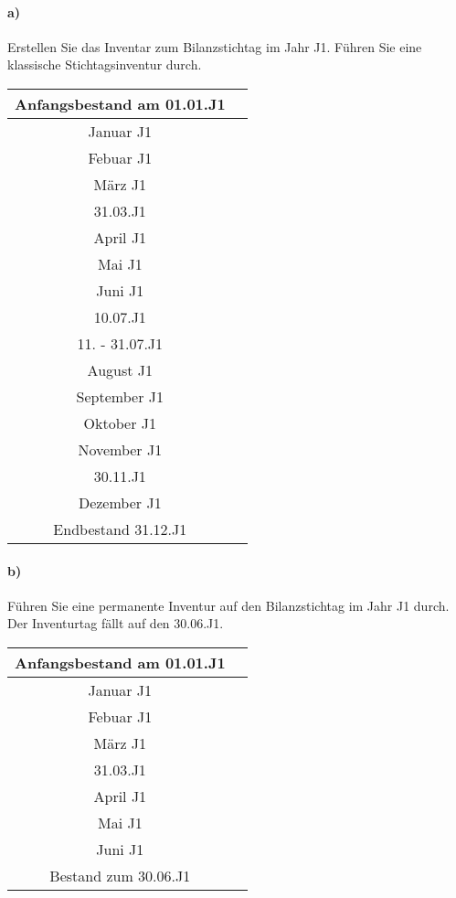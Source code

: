 \documentclass[paper=a4, fontsize=11pt]{scrartcl}
\numberwithin{equation}{section}
\numberwithin{figure}{section}
\numberwithin{table}{section}
\begin{document}
\paragraph{a)}

Erstellen Sie das Inventar zum Bilanzstichtag im Jahr J1. Führen Sie eine klassische Stichtagsinventur durch. \\

\begin{tabular}{c|c}
\hline
Anfangsbestand am 01.01.J1 & \\
\hline
Januar J1 & \\
\hline
Febuar J1 & \\
\hline 
März J1 & \\
\hline
31.03.J1 & \\
\hline
April J1 & \\
\hline
Mai J1 & \\
\hline
Juni J1 & \\
\hline
10.07.J1 & \\
\hline
11. - 31.07.J1 & \\
\hline
August J1 & \\
\hline
September J1 & \\
\hline
Oktober J1 & \\
\hline
November J1 & \\
\hline
30.11.J1 & \\
\hline
Dezember J1 & \\
\hline
Endbestand 31.12.J1 & \\
\hline
\end{tabular}

\paragraph{b)}

Führen Sie eine permanente Inventur auf den Bilanzstichtag im Jahr J1 durch. Der Inventurtag fällt auf den 30.06.J1. \\

\begin{tabular}{c|c}
\hline
Anfangsbestand am 01.01.J1 & \\
\hline
Januar J1 & \\
\hline
Febuar J1 & \\
\hline 
März J1 & \\
\hline
31.03.J1 & \\
\hline
April J1 & \\
\hline
Mai J1 & \\
\hline
Juni J1 & \\
\hline
Bestand zum 30.06.J1 & \\
\hline
\end{tabular}
\\
\end{document}
